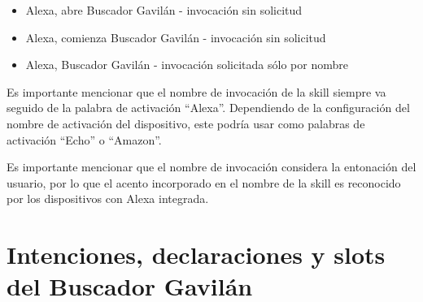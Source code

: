 \begin{itemize}
  \item Alexa, abre Buscador Gavilán - invocación sin solicitud
  \item Alexa, comienza Buscador Gavilán - invocación sin solicitud
  \item Alexa, Buscador Gavilán - invocación solicitada sólo por nombre
\end{itemize}

Es importante mencionar que el nombre de invocación de la skill siempre va seguido de la palabra de activación “Alexa”. Dependiendo de la configuración del nombre de activación del dispositivo, este podría usar como palabras de activación “Echo” o “Amazon”.

Es importante mencionar que el nombre de invocación considera la entonación del usuario, por lo que el acento incorporado en el nombre de la skill es reconocido por los dispositivos con Alexa integrada.


\section{Intenciones, declaraciones y slots del Buscador Gavilán}
\label{IntencionesDeclaracionesSlotscapIV}


